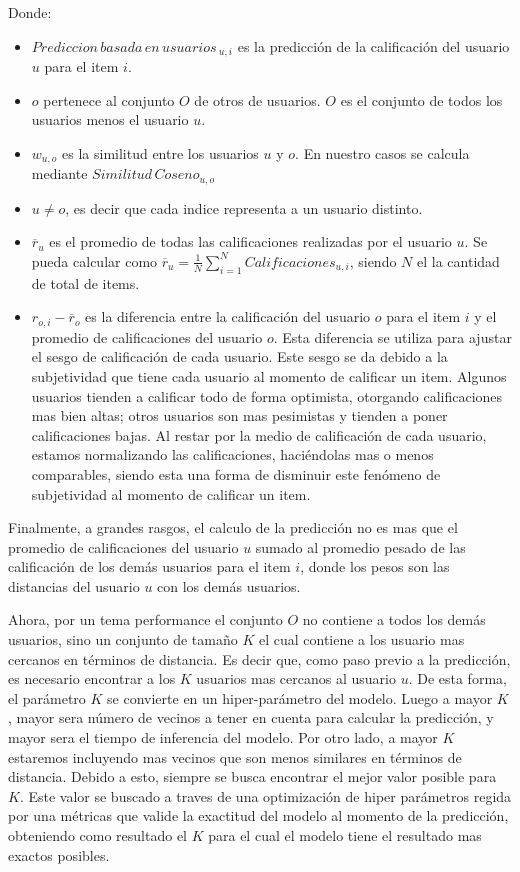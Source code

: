 \documentclass[11pt,a4paper,twoside]{thesis}
\begin{document}
\begin{description}
	\item[Donde:]
\end{description}
\begin{itemize}
	\item $Prediccion \mspace{3mu}basada \mspace{3mu}en \mspace{3mu}usuarios\mspace{3mu}_{u, i}$ es la predicción de la calificación del usuario $u$ para el item $i$.
	\item $o$ pertenece al conjunto $O$ de otros de usuarios. $O$ es el conjunto de todos los usuarios menos el usuario $u$.
	\item $w_{u,o}$ es la similitud entre los usuarios $u$ y $o$. En nuestro casos se calcula mediante $Similitud \mspace{3mu}Coseno_{u, o}$
	\item $u \neq o$, es decir que cada indice representa a un usuario distinto.
	\item $\overline{r}_{u}$ es el promedio de todas las calificaciones realizadas por el usuario $u$. Se pueda calcular como $\overline{r}_{u} = \frac{1}{N} \sum_{i=1}^N Calificaciones_{u,i}$, siendo $N$ el la cantidad de total de items.
 	\item $r_{o,i} - \overline{r}_{o}$ es la diferencia entre la calificación del usuario $o$ para el item $i$ y el promedio de calificaciones del usuario $o$. Esta diferencia se utiliza para ajustar el sesgo de calificación de cada usuario. Este sesgo se da debido a la subjetividad que tiene cada usuario al momento de calificar un item. Algunos usuarios tienden a calificar todo de forma optimista, otorgando calificaciones mas bien altas; otros usuarios son mas pesimistas y tienden a poner calificaciones bajas. Al restar por la medio de calificación de cada usuario, estamos normalizando las calificaciones, haciéndolas mas o menos comparables, siendo esta una forma de disminuir este fenómeno de subjetividad al momento de calificar un item.
\end{itemize}

Finalmente, a grandes rasgos, el calculo de la predicción no es mas que el promedio de calificaciones del usuario $u$ sumado al promedio pesado de las calificación de los demás usuarios para el item $i$, donde los pesos son las distancias del usuario $u$ con los demás usuarios.

Ahora, por un tema performance el conjunto $O$ no contiene a todos los demás usuarios, sino un conjunto de tamaño $K$ el cual contiene a los usuario mas cercanos en términos de distancia. Es decir que, como paso previo a la predicción, es necesario encontrar a los $K$ usuarios mas cercanos al usuario $u$. De esta forma, el parámetro $K$ se convierte en un hiper-parámetro del modelo. Luego a mayor $K$, mayor sera número de vecinos a tener en cuenta para calcular la predicción, y mayor sera el tiempo de inferencia del modelo. Por otro lado, a mayor $K$ estaremos incluyendo mas vecinos que son menos similares en términos de distancia. Debido a esto, siempre se busca encontrar el mejor valor posible para $K$. Este valor se buscado a traves de una optimización de hiper parámetros regida por una métricas que valide la exactitud del modelo al momento de la predicción, obteniendo como resultado el $K$ para el cual el modelo tiene el resultado mas exactos posibles.
\end{document}
